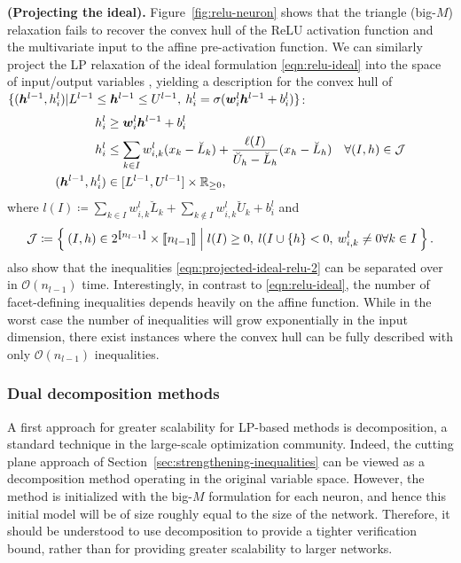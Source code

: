 \textbf{(Projecting the ideal).}
Figure~\ref{fig:relu-neuron} shows that the triangle (big-$M$) relaxation fails to recover the convex hull of the ReLU activation function and the multivariate input to the affine pre-activation function.  
We can similarly project the LP relaxation of the ideal formulation \eqref{eqn:relu-ideal} into the space of input/output variables \citep{anderson2020strong}, yielding a description for the convex hull of $\{ ({\bm{h}}^{l-1},h^l_i) | L^{l-1} \leq {\bm{h}}^{l-1} \leq U^{l-1}, \: h^l_i = \sigma({\bm{w}}^{l}_i {\bm{h}}^{l-1} + b^l_i) \}$:%
\begin{subequations}
\begin{align}
    h^l_i &\geq {\bm{w}}^l_i {\bm{h}}^{l-1} + b^l_i \\
    h^l_i &\leq \sum_{k \in I} w_{i,k}^l (x_k - \breve{L}_k) + \frac{\ell(I)}{\breve{U}_h - \breve{L}_h}(x_h - \breve{L}_h) \quad \forall (I,h) \in \mathcal{J} \label{eqn:projected-ideal-relu-2} \\
    ({\bm{h}}^{l-1},h^l_i) &\in [L^{l-1},U^{l-1}] \times \mathbb{R}_{\geq 0},
\end{align}
\end{subequations}
where $l(I) \coloneqq \sum_{k \in I} w^l_{i,k}\breve{L}_k + \sum_{k \not\in I} w^l_{i,k} \breve{U}_k + b^l_i$ and
\[
    \mathcal{J} \coloneqq \Set{ (I,h) \in 2^{\llbracket n_{l-1} \rrbracket} \times \llbracket n_{l-1} \rrbracket | l(I) \geq 0, \: l(I \cup \{h\} < 0, \: w^l_{i,k} \neq 0 \forall k \in I }.
\]
\cite{anderson2020strong} also show that the inequalities \eqref{eqn:projected-ideal-relu-2} can be separated over in $\mathcal{O}(n_{l-1})$ time. 
Interestingly, in contrast to \eqref{eqn:relu-ideal}, the number of facet-defining inequalities depends heavily on the affine function. While in the worst case the number of inequalities will grow exponentially in the input dimension, there exist instances where the convex hull can be fully described with only $\mathcal{O}(n_{l-1})$ inequalities.


\subsubsection{Dual decomposition methods}

A first approach for greater scalability for LP-based methods is decomposition, a standard technique in the large-scale optimization community. Indeed, the cutting plane approach of Section~\ref{sec:strengthening-inequalities} can be viewed as a decomposition method operating in the original variable space. However, the method is initialized with the big-$M$ formulation for each neuron, and hence this initial model will be of size roughly equal to the size of the network. Therefore, it should be understood to use decomposition to provide a tighter verification bound, rather than for providing greater scalability to larger networks.

